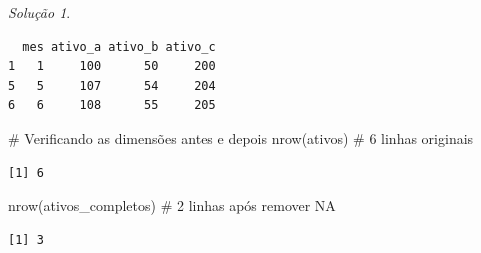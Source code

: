 \documentclass[
  portuguese,
  letterpaper,
  DIV=11,
  numbers=noendperiod]{scrreprt}
\newenvironment{Shaded}{\begin{snugshade}}{\end{snugshade}}
\newcommand{\CommentTok}[1]{\textcolor[rgb]{0.37,0.37,0.37}{#1}}
\newcommand{\FunctionTok}[1]{\textcolor[rgb]{0.28,0.35,0.67}{#1}}
\newcommand{\NormalTok}[1]{\textcolor[rgb]{0.00,0.23,0.31}{#1}}
\theoremstyle{definition}
\theoremstyle{remark}
\newtheorem*{solution}{Solução}
\begin{document}
\begin{solution}
\begin{verbatim}
  mes ativo_a ativo_b ativo_c
1   1     100      50     200
5   5     107      54     204
6   6     108      55     205
\end{verbatim}

\begin{Shaded}
\begin{Highlighting}[]
\CommentTok{\# Verificando as dimensões antes e depois}
\FunctionTok{nrow}\NormalTok{(ativos)      }\CommentTok{\# 6 linhas originais}
\end{Highlighting}
\end{Shaded}

\begin{verbatim}
[1] 6
\end{verbatim}

\begin{Shaded}
\begin{Highlighting}[]
\FunctionTok{nrow}\NormalTok{(ativos\_completos)  }\CommentTok{\# 2 linhas após remover NA}
\end{Highlighting}
\end{Shaded}

\begin{verbatim}
[1] 3
\end{verbatim}

\end{solution}
\end{document}
